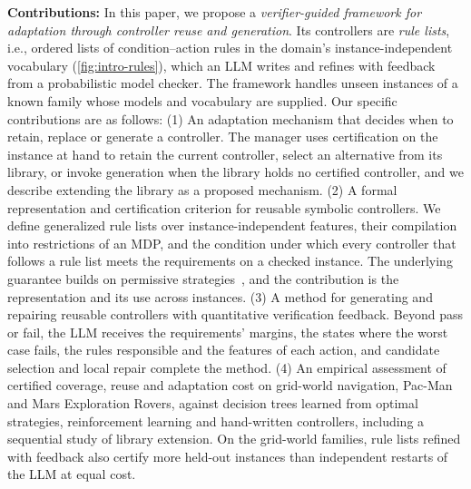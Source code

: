 \textbf{Contributions:}
In this paper, we propose a \textit{verifier-guided framework for adaptation through controller reuse and generation}.
Its controllers are \textit{rule lists}, i.e., ordered lists of condition--action rules in the domain's instance-independent vocabulary (\autoref{fig:intro-rules}), which an LLM writes and refines with feedback from a probabilistic model checker.
The framework handles unseen instances of a known family whose models and vocabulary are supplied.
Our specific contributions are as follows:
(1) An adaptation mechanism that decides when to retain, replace or generate a controller.
The manager uses certification on the instance at hand to retain the current controller, select an alternative from its library, or invoke generation when the library holds no certified controller, and we describe extending the library as a proposed mechanism.
(2) A formal representation and certification criterion for reusable symbolic controllers.
We define generalized rule lists over instance-independent features, their compilation into restrictions of an MDP, and the condition under which every controller that follows a rule list meets the requirements on a checked instance.
The underlying guarantee builds on permissive strategies~\cite{TODO-Draeger2015-permissive}, and the contribution is the representation and its use across instances.
(3) A method for generating and repairing reusable controllers with quantitative verification feedback.
Beyond pass or fail, the LLM receives the requirements' margins, the states where the worst case fails, the rules responsible and the features of each action, and candidate selection and local repair complete the method.
(4) An empirical assessment of certified coverage, reuse and adaptation cost on grid-world navigation, Pac-Man and Mars Exploration Rovers, against decision trees learned from optimal strategies, reinforcement learning and hand-written controllers, including a sequential study of library extension.
On the grid-world families, rule lists refined with feedback also certify more held-out instances than independent restarts of the LLM at equal cost.

